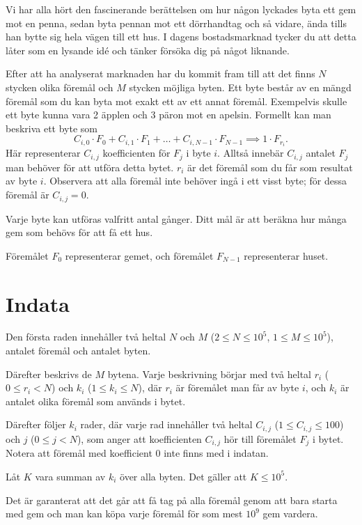 
Vi har alla hört den fascinerande berättelsen om hur någon lyckades byta ett gem mot en penna, sedan byta pennan mot
ett dörrhandtag och så vidare, ända tills han bytte sig hela vägen till ett hus. 
I dagens bostadsmarknad tycker du att detta låter som en lysande idé och tänker försöka dig på något liknande.

Efter att ha analyserat marknaden har du kommit fram till att det finns $N$ stycken olika föremål och $M$
stycken möjliga byten. Ett byte består av en mängd föremål som du kan byta mot exakt ett av ett annat föremål. 
Exempelvis skulle ett byte kunna vara 2 äpplen och 3 päron mot en apelsin. Formellt kan man beskriva ett byte som 
$$
C_{i,0} \cdot F_0 + C_{i,1} \cdot F_1 + \dots + C_{i,N-1} \cdot F_{N-1} \implies 1 \cdot F_{r_i}.
$$
Här representerar $C_{i,j}$ koefficienten för $F_j$ i byte $i$. Alltså innebär $C_{i,j}$ antalet $F_j$ man behöver för
att utföra detta bytet. $r_i$ är det föremål som du får som resultat av byte $i$. 
Observera att alla föremål inte behöver ingå i ett visst byte; för dessa föremål är $C_{i,j} = 0$.

Varje byte kan utföras valfritt antal gånger. Ditt mål är att beräkna hur många gem som behövs för att få ett hus.

Föremålet $F_0$ representerar gemet, och föremålet $F_{N-1}$ representerar huset.

\section*{Indata}
Den första raden innehåller två heltal $N$ och $M$ ($2 \leq N \leq 10^5$, $1 \leq M \leq 10^5$), antalet
föremål och antalet byten.

Därefter beskrivs de $M$ bytena. Varje beskrivning börjar med två heltal $r_i$ ($0 \leq r_i < N$) och
$k_i$ ($1 \leq k_i \leq N$),
där $r_i$ är föremålet man får av byte $i$, och $k_i$ är antalet olika föremål som används i bytet.

Därefter följer $k_i$ rader, där varje rad innehåller två heltal $C_{i,j}$ ($1 \leq C_{i,j} \leq 100$)
och $j$ ($0 \leq j < N$), 
som anger att koefficienten $C_{i,j}$ hör till föremålet $F_j$ i bytet. Notera att 
föremål med koefficient $0$ inte finns med i indatan.

Låt $K$ vara summan av $k_i$ över alla byten. Det gäller att $K \leq 10^5$.

Det är garanterat att det går att få tag på alla föremål genom att bara starta med gem och man kan köpa
varje föremål för
som mest $10^9$ gem vardera.


